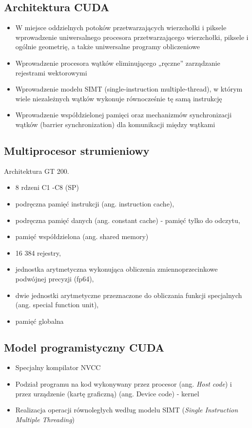 	\subsection{Architektura CUDA}
		\begin{itemize}
			\item W miejsce oddzielnych potoków przetwarzających wierzchołki i piksele wprowadzenie uniwersalnego procesora przetwarzającego wierzchołki, piksele i ogólnie geometrię, a także uniwersalne programy obliczeniowe
			\item Wprowadzenie procesora wątków eliminującego „ręczne” zarządzanie rejestrami wektorowymi
			\item Wprowadzenie modelu SIMT (single-instruction multiple-thread), w którym wiele niezależnych wątków wykonuje równocześnie tę samą instrukcję
			\item Wprowadzenie współdzielonej pamięci oraz mechanizmów synchronizacji wątków (barrier synchronization) dla komunikacji między wątkami
		\end{itemize}
	\subsection{Multiprocesor strumieniowy}
		Architektura GT 200.
		\begin{itemize}
			\item 8 rdzeni C1 -C8 (SP)
			\item podręczna pamięć instrukcji (ang. instruction cache),
			\item podręczna pamięć danych (ang. constant cache) - pamięć tylko do odczytu,
			\item pamięć współdzielona (ang. shared memory)
			\item 16 384 rejestry,
			\item jednostka arytmetyczna wykonująca obliczenia zmiennoprzecinkowe podwójnej precyzji (fp64),
			\item dwie jednostki arytmetyczne przeznaczone do obliczania funkcji specjalnych (ang. special function unit),
			\item pamięć globalna
		\end{itemize}
	\subsection{Model programistyczny CUDA}
		\begin{itemize}
			\item Specjalny kompilator NVCC
			\item Podział programu na kod wykonywany przez procesor (ang. \emph{Host code}) i przez urządzenie (kartę graficzną) (ang. Device code) - kernel
			\item Realizacja operacji równoległych według modelu SIMT (\emph{Single Instruction Multiple Threading})
		\end{itemize}
